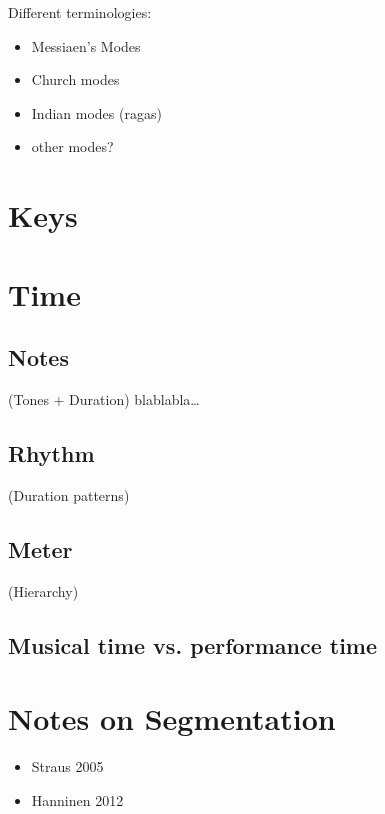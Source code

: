 \documentclass[letterpaper,10pt,english]{sphinxmanual}
\begin{document}
Different terminologies:
\begin{itemize}
\item {} 
Messiaen’s Modes

\item {} 
Church modes

\item {} 
Indian modes (ragas)

\item {} 
other modes?

\end{itemize}


\section{Keys}
\label{\detokenize{3_fundamentals2:keys}}

\section{Time}
\label{\detokenize{3_fundamentals2:time}}

\subsection{Notes}
\label{\detokenize{3_fundamentals2:notes}}
(Tones + Duration)
blablabla…


\subsection{Rhythm}
\label{\detokenize{3_fundamentals2:rhythm}}
(Duration patterns)


\subsection{Meter}
\label{\detokenize{3_fundamentals2:meter}}
(Hierarchy)


\subsection{Musical time vs. performance time}
\label{\detokenize{3_fundamentals2:musical-time-vs-performance-time}}

\section{Notes on Segmentation}
\label{\detokenize{3_fundamentals2:notes-on-segmentation}}\begin{itemize}
\item {} 
Straus 2005

\item {} 
Hanninen 2012

\end{itemize}
\end{document}
